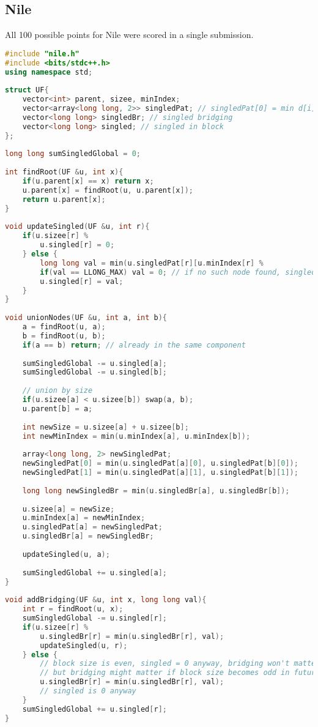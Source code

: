 \subsection{Nile}
All 100 possible points for Nile were scored in a single submission.

\begin{lstlisting}[language=C++]
#include "nile.h"
#include <bits/stdc++.h>
using namespace std;
 
struct UF{
    vector<int> parent, sizee, minIndex;
    vector<array<long long, 2>> singledPat; // singledPat[0] = min d[i] for i mod 2 = 0 in block, singledPat[1] for i mod 2 = 1 in block
    vector<long long> singledBr; // singled bridging
    vector<long long> singled; // singled in block
};
 
long long sumSingledGlobal = 0;
 
int findRoot(UF &u, int x){
    if(u.parent[x] == x) return x;
    u.parent[x] = findRoot(u, u.parent[x]);
    return u.parent[x];
}
 
void updateSingled(UF &u, int r){
    if(u.sizee[r] %
        u.singled[r] = 0;
    } else {
        long long val = min(u.singledPat[r][u.minIndex[r] %
        if(val == LLONG_MAX) val = 0; // if no such node found, singled = 0?
        u.singled[r] = val;
    }
}
 
void unionNodes(UF &u, int a, int b){
    a = findRoot(u, a);
    b = findRoot(u, b);
    if(a == b) return; // already in the same component
 
    sumSingledGlobal -= u.singled[a];
    sumSingledGlobal -= u.singled[b];
 
    // union by size
    if(u.sizee[a] < u.sizee[b]) swap(a, b);
    u.parent[b] = a;
 
    int newSize = u.sizee[a] + u.sizee[b];
    int newMinIndex = min(u.minIndex[a], u.minIndex[b]);
 
    array<long long, 2> newSingledPat;
    newSingledPat[0] = min(u.singledPat[a][0], u.singledPat[b][0]);
    newSingledPat[1] = min(u.singledPat[a][1], u.singledPat[b][1]);
 
    long long newSingledBr = min(u.singledBr[a], u.singledBr[b]);
 
    u.sizee[a] = newSize;
    u.minIndex[a] = newMinIndex;
    u.singledPat[a] = newSingledPat;
    u.singledBr[a] = newSingledBr;
 
    updateSingled(u, a);
 
    sumSingledGlobal += u.singled[a];
}
 
void addBridging(UF &u, int x, long long val){
    int r = findRoot(u, x);
    sumSingledGlobal -= u.singled[r];
    if(u.sizee[r] %
        u.singledBr[r] = min(u.singledBr[r], val);
        updateSingled(u, r);
    } else {
        // block size is even, singled = 0 anyway, bridging won't matter because singledBr is for odd sized block.
        // but bridging might matter if block size becomes odd in future merges, so store singledBr as well.
        u.singledBr[r] = min(u.singledBr[r], val);
        // singled is 0 anyway
    }
    sumSingledGlobal += u.singled[r];
}
 

\end{lstlisting}
